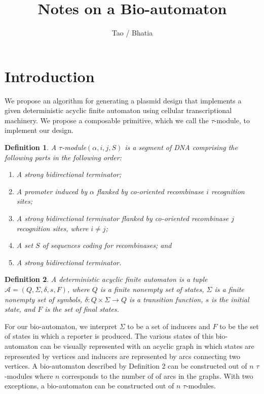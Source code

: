 \documentclass{article}
\title{Notes on a Bio-automaton}
\author{
Tao / Bhatia
}
\date{}
\newtheorem{mydef}{Definition}
\begin{document}
\maketitle
\thispagestyle{empty}

\section{Introduction}

We propose an algorithm for generating a plasmid design that implements a given deterministic acyclic
finite automaton using cellular transcriptional machinery. We propose a composable primitive, which
we call the $\tau$-module, to implement our design.


\begin{mydef}
A $\tau$-module$(\alpha,i,j,S)$ is a segment of DNA comprising the following parts in the following order:
\begin{enumerate}
\item A strong bidirectional terminator;
\item A promoter induced by $\alpha$ flanked by co-oriented recombinase $i$ recognition sites;
\item A strong bidirectional terminator flanked by co-oriented recombinase $j$ recognition sites, where $i\neq
j$;
\item A set $S$ of sequences coding for recombinases; and 
\item A strong bidirectional terminator.
\end{enumerate}
\end{mydef}


\begin{mydef}
A deterministic acyclic finite automaton is a tuple $\mathcal{A} = (Q, \Sigma, \delta, s, F)$, where
$Q$ is a finite nonempty set of states, $\Sigma$ is a finite nonempty set of symbols, $\delta: Q
\times \Sigma \rightarrow Q$ is a transition function, $s$ is the initial state, and $F$ is the set
of final states.
\end{mydef}

For our bio-automaton, we interpret $\Sigma$ to be a set of inducers and $F$ to be the set of states
in which a reporter is produced.  The various states of this bio-automaton can be visually represented with an acyclic graph in which states are represented by vertices and inducers are represented by arcs connecting two vertices.  A bio-automaton described by Definition 2 can be constructed out of $n$ $\tau$-modules  where $n$ corresponds to the number of of arcs in the graphs.  With two exceptions, a bio-automaton can be constructed out of $n$ $ \tau$-modules.  
\end{document}
